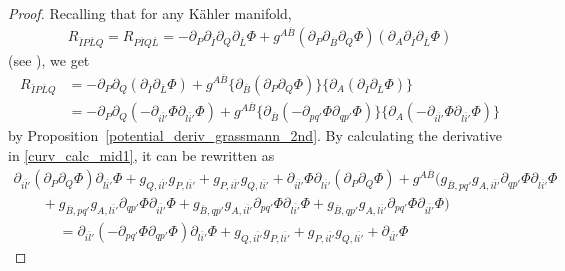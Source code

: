 \documentclass[10pt,a4paper]{amsart}
\numberwithin{equation}{section}
\begin{document}
\begin{proof}
Recalling that for any K\"ahler manifold,
\begin{align*}
 R_{\overline{I}P\overline{L}Q}
 =
 R_{P\overline{I}Q\overline{L}}
 =
 -\partial_{P}\partial_{\overline{I}}\partial_{Q}\partial_{\overline{L}}\Phi
 +
 g^{A\overline{B}}
 (
 \partial_{P}\partial_{\overline{B}}\partial_{Q}\Phi
 )
 (
 \partial_{A}\partial_{\overline{I}}\partial_{\overline{L}}\Phi
 )
\end{align*}
(see \cite[Appendix A]{OS_jrnl}),
we get
\begin{align}
 R_{\overline{I}P\overline{L}Q}
& =
 -
 \partial_{P}\partial_{Q}
 (
 \partial_{\overline{I}}\partial_{\overline{L}}\Phi
 )
 +
 g^{A\overline{B}}
 \{
 \partial_{\overline{B}}
 (
 \partial_{P}\partial_{Q}\Phi
 )
 \}
 \{
 \partial_{A}
 (
 \partial_{\overline{I}}\partial_{\overline{L}}\Phi
 )
 \}
 \nonumber
 \\
 &=
 -
 \partial_{P}\partial_{Q}
 (
 -
 \partial_{\overline{il'}}\Phi
 \partial_{\overline{li'}}\Phi
 )
 +
 g^{A\overline{B}}
 \{
 \partial_{\overline{B}}
 (
 -
 \partial_{pq'}\Phi
 \partial_{qp'}\Phi
 )
 \}
 \{
 \partial_{A}
 (
 -
 \partial_{\overline{il'}}\Phi
 \partial_{\overline{li'}}\Phi
 )
 \}
 \label{curv_calc_mid1}
\end{align}
by Proposition~\ref{potential_deriv_grassmann_2nd}.
By calculating the derivative in \eqref{curv_calc_mid1}, it can be rewritten as
\begin{gather}
 \partial_{\overline{il'}}
 (
 \partial_{P}\partial_{Q}\Phi
 )
 \partial_{\overline{li'}}\Phi
 +
 g_{Q,\overline{il'}}
 g_{P,\overline{li'}}
 +
 g_{P,\overline{il'}}
 g_{Q,\overline{li'}}
 +
 \partial_{\overline{il'}}\Phi
 \partial_{\overline{li'}}
 (
 \partial_{P}\partial_{Q}\Phi
 ) +
 g^{A\overline{B}}
 \bigl(
 g_{\overline{B},pq'}
 g_{A,\overline{il'}}
 \partial_{qp'}\Phi
 \partial_{\overline{li'}}\Phi
 \nonumber
 \\
 \qquad
 {}+
 g_{\overline{B},pq'}
 g_{A,\overline{li'}}
 \partial_{qp'}\Phi
 \partial_{\overline{il'}}\Phi
 +
 g_{\overline{B},qp'}
 g_{A,\overline{il'}}
 \partial_{pq'}\Phi
 \partial_{\overline{li'}}\Phi
 +
 g_{\overline{B},qp'}
 g_{A,\overline{li'}}
 \partial_{pq'}\Phi
 \partial_{\overline{il'}}\Phi
 \bigr)
 \nonumber
 \\
 \phantom{\qquad
 +}{}=
 \partial_{\overline{il'}}
 (
 -
 \partial_{pq'}\Phi
 \partial_{qp'}\Phi
 )
 \partial_{\overline{li'}}\Phi
 +
 g_{Q,\overline{il'}}
 g_{P,\overline{li'}}
 +
 g_{P,\overline{il'}}
 g_{Q,\overline{li'}}
 +
 \partial_{\overline{il'}}\Phi

\end{gather}
\end{proof}
\end{document}
